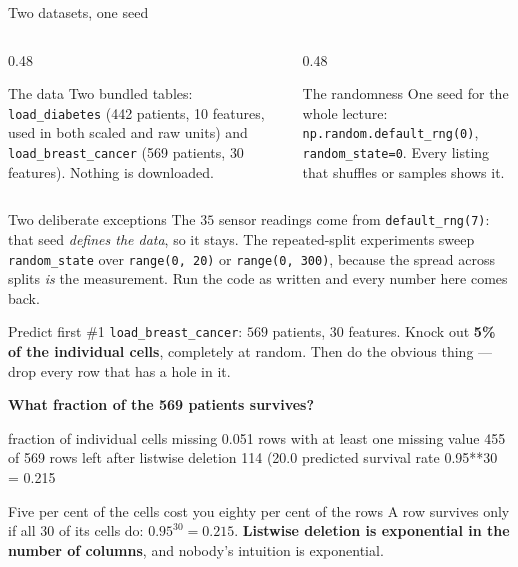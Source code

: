 \documentclass[aspectratio=169]{beamer}
\begin{document}
\begin{frame}{Two datasets, one seed}
  \begin{columns}[T]
    \begin{column}{0.48\textwidth}
      \begin{block}{The data}
        \small Two bundled tables: \texttt{load\_diabetes} (442 patients,
        10 features, used in both scaled and raw units) and
        \texttt{load\_breast\_cancer} (569 patients, 30 features). Nothing
        is downloaded.
      \end{block}
    \end{column}
    \begin{column}{0.48\textwidth}
      \begin{block}{The randomness}
        \small One seed for the whole lecture:
        \texttt{np.random.default\_rng(0)}, \texttt{random\_state=0}.
        Every listing that shuffles or samples shows it.
      \end{block}
    \end{column}
  \end{columns}
  \begin{exampleblock}{Two deliberate exceptions}
    \small The $35$ sensor readings come from \texttt{default\_rng(7)}:
    that seed \emph{defines the data}, so it stays. The repeated-split
    experiments sweep \texttt{random\_state} over \texttt{range(0, 20)} or
    \texttt{range(0, 300)}, because the spread across splits \emph{is} the
    measurement. Run the code as written and every number here comes back.
  \end{exampleblock}
\end{frame}

\begin{frame}[fragile]{Predict first \#1}
\texttt{load\_breast\_cancer}: $569$ patients, $30$ features. Knock out
\textbf{5\% of the individual cells}, completely at random. Then do the
obvious thing --- drop every row that has a hole in it.

\begin{center}
  \textbf{What fraction of the 569 patients survives?}
\end{center}
\vspace{0.3em}
\begin{outblk}
fraction of individual cells missing      0.051
rows with at least one missing value      455 of 569
rows left after listwise deletion         114  (20.0%
predicted survival rate  0.95**30       = 0.215
\end{outblk}
\begin{alertblock}{Five per cent of the cells cost you eighty per cent of the rows}
  \footnotesize A row survives only if all $30$ of its cells do:
  $0.95^{30} = 0.215$. \textbf{Listwise deletion is exponential in the number
  of columns}, and nobody's intuition is exponential.
\end{alertblock}
\end{frame}
\end{document}
